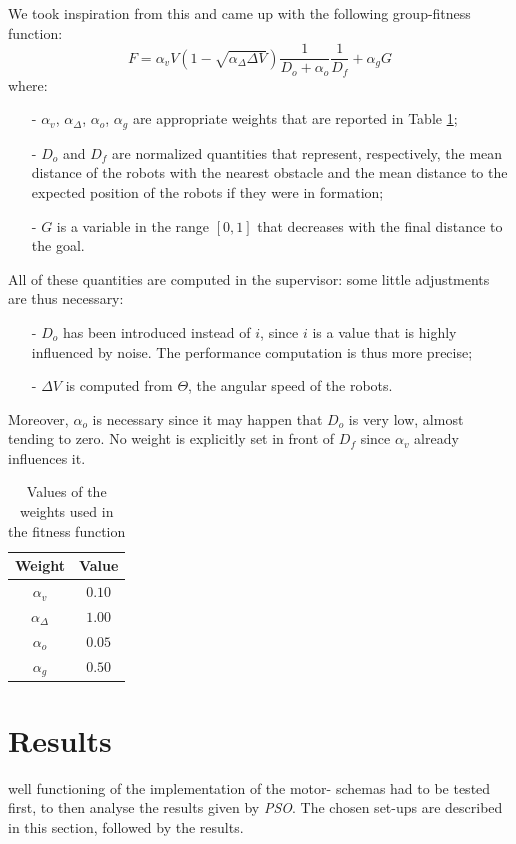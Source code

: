 \documentclass[journal]{IEEEtran}
\begin{document}
We took inspiration from this  and came up with the following group-fitness function: 
\begin {equation}
F=\alpha_vV(1-\sqrt{\alpha_{\Delta}\Delta V})\frac{1}{D_o+\alpha_o}\frac{1}{D_f}+\alpha_gG
\end{equation}
where:
\begin{itemize}
\item[-] $\alpha_v$, $\alpha_\Delta$, $\alpha_o$, $\alpha_g$ are appropriate weights that are reported in Table \ref{weights_fitfct};
\item[-] $D_o$ and $D_f$ are normalized quantities that represent, respectively, the mean distance of the robots with the nearest obstacle and the mean distance to the expected position of the robots if they were in formation; 
\item[-] $G$ is a variable in the range $[0,1]$ that decreases with the final distance to the goal.
\end{itemize} 
All of these quantities are computed in the supervisor: some little adjustments are thus necessary: 
\begin{itemize}
\item[-] $D_o$ has been introduced instead of $i$, since $i$ is a value that is highly influenced by noise. The performance computation is thus more precise;
\item[-] $\Delta V$ is computed from $\Theta$, the angular speed of the robots.
\end{itemize}
Moreover, $\alpha_o$ is necessary since it may happen that $D_o$ is very low, almost tending to zero. No weight is explicitly set in front of $D_f$ since $\alpha_v$ already influences it.
\begin{table}
\begin{center}
\begin{tabular}{|c|c|}
  \hline
  Weight & Value\\
  \hline
  $\alpha_v$      & $0.10$ \\
  $\alpha_\Delta$ & $1.00$ \\
  $\alpha_o$      & $0.05$ \\
  $\alpha_g$      & $0.50$ \\
  \hline
\end{tabular}
\caption{Values of the weights used in the fitness function} \label{weights_fitfct}
\end{center} 
\end{table}

\section{Results}
\label{sec:4}
 well functioning of the implementation of the motor-
schemas had to be tested first, to then analyse the results given by 
\textit{PSO}. The chosen set-ups are described in this section, followed by 
the results. 
\end{document}
